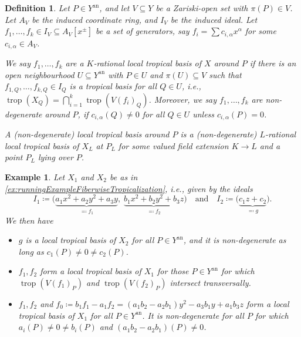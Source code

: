 \documentclass[12pt,reqno,a4paper]{amsart}
\theoremstyle{theoremstyle}
\theoremstyle{examplestyle}
\newtheorem{example}[theorem]{Example}
\newtheorem{definition}[theorem]{Definition}
\theoremstyle{algorithmstyle}
\newcommand{\an}{{\mathrm{an}}}
\DeclareMathOperator{\Trop}{trop}
\begin{document}
\begin{definition}\label{def:TropicalBases}
  Let $P\in Y^\an$, and let $V\subseteq Y$ be a Zariski-open set with $\pi(P)\in V$. Let $A_V$ be the induced coordinate ring, and $I_V$ be the induced ideal.  Let $f_1,\dots,f_k\in I_V\subseteq A_V[x^\pm]$ be a set of generators, say $f_i=\sum c_{i,\alpha}x^{\alpha}$ for some $c_{i,\alpha}\in A_V$.

  We say $f_1,\dots,f_k$ are a \emph{$K$-rational local tropical basis} of $X$ around $P$ if there is an open neighbourhood $U\subseteq Y^\an$ with $P\in U$ and $\pi(U)\subseteq V$ such that $f_{1,Q},\dots,f_{k,Q}\in I_Q$ is a tropical basis for all $Q\in U$, i.e., $\Trop(X_{Q})=\bigcap_{i=1}^{k} \Trop(V(f_{i})_{Q})$. Moreover, we say $f_1,\dots,f_k$ are \emph{non-degenerate} around $P$, if $c_{i,\alpha}(Q)\neq 0$ for all $Q\in U$ unless $c_{i,\alpha}(P)=0$.

  A \emph{(non-degenerate) local tropical basis} around $P$ is a (non-degenerate) $L$-rational local tropical basis of $X_L$ at $P_L$ for some valued field extension $K\to{L}$ and a point $P_{L}$ lying over $P$.
\end{definition}

\begin{example}
  \label{ex:runningExampleTropicalBasis}
  Let $X_1$ and $X_2$ be as in \cref{ex:runningExampleFiberwiseTropicalization}, i.e., given by the ideals
  \begin{equation*}
    I_1\coloneqq \big(\underbrace{a_1x^2+a_2y^2+a_3y}_{\eqqcolon f_1},\; \underbrace{b_1x^2+b_2y^2+b_3z}_{\eqqcolon f_2}\big) \quad\text{and}\quad I_2\coloneqq \big( \underbrace{c_1z+c_2}_{\eqqcolon g} \big).
  \end{equation*}
  We then have
  \begin{itemize}[leftmargin=7mm]
  \item $g$ is a local tropical basis of $X_2$ for all $P\in Y^{\an}$, and it is non-degenerate as long as $c_{1}(P)\neq 0\neq c_{2}(P)$.
  \item $f_1,f_2$ form a local tropical basis of $X_1$ for those $P\in Y^{\an}$ for which $\Trop(V(f_1)_P)$ and $\Trop(V(f_2)_P)$ intersect transversally.
  \item $f_1,f_2$ and $f_0\coloneqq b_1f_1-a_1f_2 = (a_1b_2 - a_2b_1)y^2 - a_3b_1y + a_1b_3z$ form a local tropical basis of $X_1$ for all $P\in Y^{\an}$. It is non-degenerate for all $P$ for which $a_{i}(P)\neq 0\neq b_{i}(P)$ and $(a_{1}b_{2} - a_{2}b_{1})(P)\neq 0$.
  \end{itemize}
\end{example}
\end{document}
